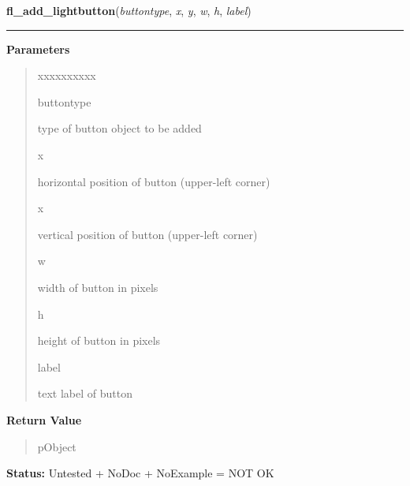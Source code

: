     \label{xformslib:library:fl_add_lightbutton}

    \vspace{0.5ex}

\hspace{.8\funcindent}\begin{boxedminipage}{\funcwidth}

    \raggedright \textbf{fl\_add\_lightbutton}(\textit{buttontype}, \textit{x}, \textit{y}, \textit{w}, \textit{h}, \textit{label})

    \vspace{-1.5ex}

    \rule{\textwidth}{0.5\fboxrule}
\setlength{\parskip}{2ex}
\setlength{\parskip}{1ex}
      \textbf{Parameters}
      \vspace{-1ex}

      \begin{quote}
        \begin{Ventry}{xxxxxxxxxx}

          \item[buttontype]

          type of button object to be added

          \item[x]

          horizontal position of button (upper-left corner)

          \item[x]

          vertical position of button (upper-left corner)

          \item[w]

          width of button in pixels

          \item[h]

          height of button in pixels

          \item[label]

          text label of button

        \end{Ventry}

      \end{quote}

      \textbf{Return Value}
    \vspace{-1ex}

      \begin{quote}
      pObject

      \end{quote}

\textbf{Status:} Untested + NoDoc + NoExample = NOT OK



    \end{boxedminipage}

